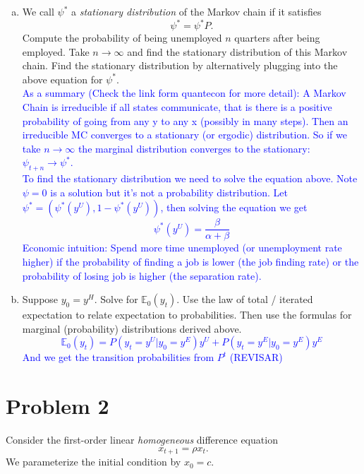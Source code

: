 \documentclass[11pt]{extarticle}
\theoremstyle{plain}
\theoremstyle{definition}
\begin{document}
\begin{enumerate}[(a)]
\item We call $\psi^*$ a \textit{stationary distribution} of the Markov chain if it satisfies 
\begin{equation*}
	\psi^* = \psi^* P.
\end{equation*}
Compute the probability of being unemployed $n$ quarters after being employed. Take $n \to \infty$ and find the stationary distribution of this Markov chain. Find the stationary distribution by alternatively plugging into the above equation for $\psi^*$. \\
\textcolor{blue}{As a summary (Check the link form quantecon for more detail): A Markov Chain is irreducible if all states communicate, that is there is a positive probability of going from any y to any x (possibly in many steps). Then an irreducible MC converges to a stationary (or ergodic) distribution. So if we take $n\rightarrow \infty$ the marginal distribution converges to the stationary: $\psi_{t+n}\rightarrow \psi^*$.\\
To find the stationary distribution we need to solve the equation above. Note $\psi =0$ is a solution but it's not a probability distribution. Let $\psi^* = (\psi^*(y^U),1-\psi^*(y^U))$, then solving the equation we get $$\psi^*(y^U)=\frac{\beta}{\alpha + \beta }$$
Economic intuition: Spend more time unemployed (or unemployment rate higher) if the probability of finding a job is lower (the job finding rate) or the probability of losing job is higher (the separation rate). }
\item Suppose $y_0 = y^H$. Solve for $\mathbb E_0 (y_t)$. Use the law of total / iterated expectation to relate expectation to probabilities. Then use the formulas for marginal (probability) distributions derived above. 
\textcolor{blue}{$$\mathbb E_0 (y_t)=P(y_t=y^U|y_0=y^E)y^U+P(y_t=y^E|y_0=y^E)y^E $$ And we get the transition probabilities from $P^t$ (REVISAR)}
\end{enumerate}



\vspace{10mm}
\section*{Problem 2}

Consider the first-order linear \textit{homogeneous} difference equation 
\begin{equation*}
	x_{t+1} = \rho x_t.
\end{equation*}
We parameterize the initial condition by $x_0 = c$. 
\end{document}

